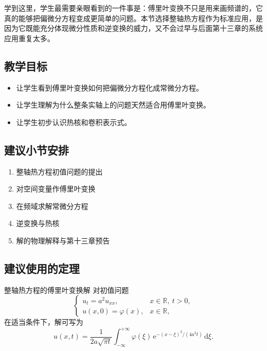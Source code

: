 \begin{wulibj}[本节要解决的问题]
学到这里，学生最需要亲眼看到的一件事是：傅里叶变换不只是用来画频谱的，它真的能够把偏微分方程变成更简单的问题。本节选择整轴热方程作为标准应用，是因为它既能充分体现微分性质和逆变换的威力，又不会过早与后面第十三章的系统应用重复太多。
\end{wulibj}

\subsection*{教学目标}
\begin{itemize}
    \item 让学生看到傅里叶变换如何把偏微分方程化成常微分方程。
    \item 让学生理解为什么整条实轴上的问题天然适合用傅里叶变换。
    \item 让学生初步认识热核和卷积表示式。
\end{itemize}

\subsection*{建议小节安排}
\begin{enumerate}
    \item 整轴热方程初值问题的提出
    \item 对空间变量作傅里叶变换
    \item 在频域求解常微分方程
    \item 逆变换与热核
    \item 解的物理解释与第十三章预告
\end{enumerate}

\subsection*{建议使用的定理}
\begin{dingli}{整轴热方程的傅里叶变换解}{}
对初值问题
\[
    \begin{cases}
        u_t=a^2 u_{xx}, & x\in \mathbb{R}, \ t>0, \\
        u(x,0)=\varphi(x), & x\in \mathbb{R},
    \end{cases}
\]
在适当条件下，解可写为
\[
    u(x,t)=\frac{1}{2a\sqrt{\pi t}}
    \int_{-\infty}^{+\infty}
    \varphi(\xi)\,
    \mathrm{e}^{-(x-\xi)^2/(4a^2 t)}
    \,\mathrm{d}\xi.
\]
\end{dingli}

